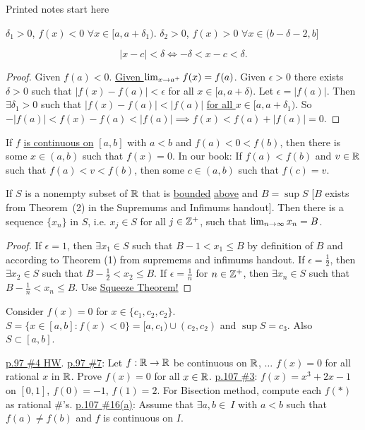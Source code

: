 \documentclass[]{article}
\begin{document}
\newpage

Printed notes start here

$\delta_1>0$, $f(x)<0$ $\forall x\in [a,a+\delta_1)$. $\delta_2>0$, $f(x)>0$ $\forall x\in (b-\delta-2,b]$

$$|x-c|<\delta \iff -\delta < x-c <\delta.$$

\begin{proof}
	Given $f(a)<0$. \ul{Given $\lim_{x\rightarrow a^+}f(x) = f(a)$}.
	Given $\epsilon>0$ there exists $\delta>0$ such that $|f(x)-f(a)|<\epsilon$ for all $x\in [a,a+\delta)$.
	Let $\epsilon = |f(a)|$. Then $\exists \delta_1>0$ such that $|f(x)-f(a)|<|f(a)|$ \ul{for all $x\in [a,a+\delta_1)$}.
	So $-|f(a)|<f(x)-f(a) < |f(a)| \implies f(x) < f(a) + |f(a)| = 0$.
\end{proof}

\begin{theorem}
	[Spivak p.122] If $f$ \ul{is continuous on} $[a,b]$ with $a<b$ and $f(a)<0<f(b)$, then there is some $x\in(a,b)$ such that \ul{$f(x) = 0$}. In our book: If $f(a)<f(b)$ and $v\in\mathbb{R}$ such that $f(a)<v<f(b)$, then some $c\in(a,b)$ such that $f(c) = v$.
\end{theorem}
\begin{lemma}
	[p. 99] If $S$ is a nonempty subset of $\mathbb{R}$ that is \ul{bounded} \ul{above} and \ul{$B = \sup{S}$} [$B$ exists from Theorem~(2) in the Supremums and Infimums handout]. Then there is a sequence $\{x_n\}$ in $S$, i.e. $x_j\in S$ for all $j\in \mathbb{Z}^+$, such that $\lim_{n\rightarrow\infty} x_n = B$.
\end{lemma}
\begin{proof}
	If $\epsilon = 1$, then $\exists x_1\in S$ such that $B-1<x_1 \leq B$ by definition of $B$ and according to Theorem (1) from supremems and infimums handout. If $\epsilon = \frac{1}{2}$, then $\exists x_2\in S$ such that $B-\frac{1}{2} < x_2 \leq B$. If $\epsilon = \frac{1}{n}$ for $n\in \mathbb{Z}^+$, then $\exists x_n \in S$ such that $B-\frac{1}{n} < x_n \leq B$. Use \ul{Squeeze Theorem!}
\end{proof}

\begin{example}
	Consider $f(x) = 0$ for $x\in\{c_1,c_2,c_2\}$. $S = \{x\in [a,b]: f(x)<0\} = [a,c_1)\cup (c_2,c_2)$ and $\sup S = c_3$. Also $S\subset [a,b]$.
\end{example}

\ul{p.97 \#4 HW}. \ul{p.97 \#7}: Let $f:\mathbb{R} \rightarrow \mathbb{R}$ be continuous on $\mathbb{R}$, $\dots$ $f(x)=0$ for all rational $x$ in $\mathbb{R}$. Prove $f(x)=0$ for all $x\in \mathbb{R}$. \ul{p.107 \#3}: $f(x) = x^3+2x-1$ on $[0,1]$, $f(0) = -1$, $f(1) = 2$. For Bisection method, compute each $f(*)$ as rational \#'s. \ul{p.107 \#16(a)}: Assume that $\exists a,b\in\ I$ with $a<b$ such that $f(a)\neq f(b)$ and $f$ is continuous on $I$.
\end{document}
